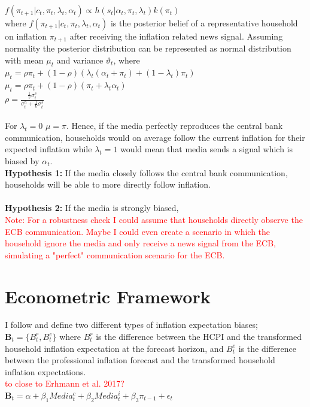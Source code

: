 \documentclass[review]{elsarticle}
\begin{document}
\\
$ f(\pi_{t+1}|c_t, \pi_t, \lambda_t, \alpha_t) \propto  h(s_t|\alpha_t, \pi_t, \lambda_t) k(\pi_t)$
\\
where $f(\pi_{t+1}|c_t, \pi_t, \lambda_t, \alpha_t)$ is the posterior belief of a representative household on inflation $\pi_{t+1}$ after receiving the inflation related news signal. Assuming normality the posterior distribution can be represented as normal distribution with mean $\mu_t$ and variance $\vartheta_t$, where
\\
$ \mu_t = \rho \pi_t + (1 - \rho)(\lambda_t (\alpha_t + \pi_t) + (1-\lambda_t) \pi_t) $
\\
$ \mu_t = \rho \pi_t + (1- \rho) (\pi_t + \lambda_t \alpha_t)  $
\\
$\rho = \frac{\frac{1}{V}\sigma^s_t}{{\sigma^h_t + \frac{1}{V}}\sigma^s_t}$
\\
\\
For $\lambda_t = 0$ $\mu = \pi$. Hence, if the media perfectly reproduces the central bank communication, households would on average follow the current inflation for their expected inflation while $\lambda_t = 1$ would mean that media sends a signal which is biased by $\alpha_t$.  
\\
\textbf{Hypothesis 1:} If the media closely follows the central bank communication, households will be able to more directly follow inflation.
\\
\\
\textbf{Hypothesis 2:} If the media is strongly biased, 
\\
\textcolor{red}{Note: For a robustness check I could assume that households directly observe the ECB communication. Maybe I could even create a scenario in which the household ignore the media and only receive a news signal from the ECB, simulating a "perfect" communication scenario for the ECB.}  

\section{Econometric Framework}\label{sec:Econometric Framework}

I follow \cite{Erhmann2017} and define two different types of inflation expectation biases; $\mathbf{B}_t = \{B^r_t, B^e_t \}$ where $B^r_t$ is the difference between the HCPI and the transformed household inflation expectation at the forecast horizon, and $B^e_t$ is the difference between the professional inflation forecast and the transformed household inflation expectations.
\\
\textcolor{red}{to close to Erhmann et al. 2017?}
\\
$\mathbf{B}_t = \alpha + \beta_1 Media^c_t + \beta_2 Media^i_t + \beta_3 \pi_{t-1} + \epsilon_t$ \\
\end{document}
